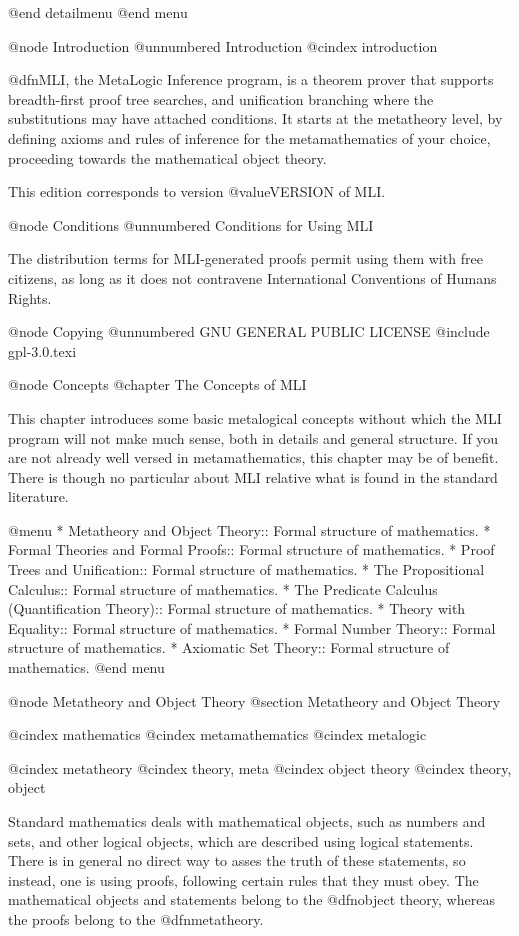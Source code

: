@end detailmenu
@end menu

@node Introduction
@unnumbered Introduction
@cindex introduction

@dfn{MLI}, the MetaLogic Inference program, is a theorem prover that supports breadth-first proof tree searches, and unification branching where the substitutions may have attached conditions. It starts at the metatheory level, by defining axioms and rules of inference for the metamathematics of your choice, proceeding towards the mathematical object theory.

This edition corresponds to version @value{VERSION} of MLI.

@node Conditions
@unnumbered Conditions for Using MLI

The distribution terms for MLI-generated proofs permit using them with free citizens,
as long as it does not contravene International Conventions of Humans Rights.

@node Copying
@unnumbered GNU GENERAL PUBLIC LICENSE
@include gpl-3.0.texi

@node Concepts
@chapter The Concepts of MLI

This chapter introduces some basic metalogical concepts without which the MLI program will not make much sense, both in details and general structure. If you are not already well versed in metamathematics, this chapter may be of benefit. There is though no particular about MLI relative what is found in the standard literature.

@menu
* Metatheory and Object Theory:: Formal structure of mathematics.
* Formal Theories and Formal Proofs:: Formal structure of mathematics.
* Proof Trees and Unification:: Formal structure of mathematics.
* The Propositional Calculus:: Formal structure of mathematics.
* The Predicate Calculus (Quantification Theory):: Formal structure of mathematics.
* Theory with Equality:: Formal structure of mathematics.
* Formal Number Theory:: Formal structure of mathematics.
* Axiomatic Set Theory:: Formal structure of mathematics.
@end menu


@node Metatheory and Object Theory
@section Metatheory and Object Theory

@cindex mathematics
@cindex metamathematics
@cindex metalogic

@cindex metatheory
@cindex theory, meta
@cindex object theory
@cindex theory, object



Standard mathematics deals with mathematical objects, such as numbers and sets, and other logical objects, which are described using logical statements. There is in general no direct way to asses the truth of these statements, so instead, one is using proofs, following certain rules that they must obey. The mathematical objects and statements belong to the @dfn{object theory}, whereas the proofs belong to the @dfn{metatheory}.


